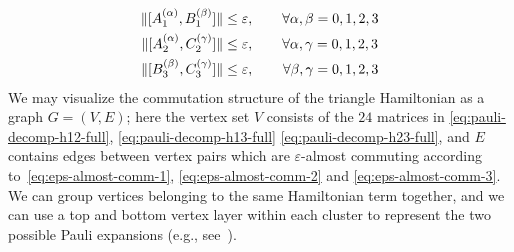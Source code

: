 \documentclass[11pt]{article}
\theoremstyle{plain}
\newcommand{\eps}{\varepsilon}
\begin{document}
\begin{align}
\|[A_1^{(\alpha)}, B_1^{(\beta)}]\| &\leq \eps, \quad\quad \forall 
\alpha,\beta=0,1,2,3 \label{eq:eps-almost-comm-1}\\
\|[A_2^{(\alpha)}, C_2^{(\gamma)}]\| &\leq \eps, \quad\quad \forall 
\alpha,\gamma=0,1,2,3 \label{eq:eps-almost-comm-2}\\
\|[B_3^{(\beta)}, C_3^{(\gamma)}]\| &\leq \eps, \quad\hspace{3.7mm} \forall 
\beta,\gamma=0,1,2,3\label{eq:eps-almost-comm-3}
\end{align}
We may visualize the commutation structure of the triangle Hamiltonian as a graph $G=(V,E)$; here the vertex set $V$ consists of the $24$ matrices in \eqref{eq:pauli-decomp-h12-full}, \eqref{eq:pauli-decomp-h13-full} \eqref{eq:pauli-decomp-h23-full}, and $E$ contains edges between vertex pairs which are $\eps$-almost commuting according to~\eqref{eq:eps-almost-comm-1}, \eqref{eq:eps-almost-comm-2} and \eqref{eq:eps-almost-comm-3}. We can group vertices belonging to the same Hamiltonian term together, and we can use a top and bottom vertex layer within each cluster to represent the two possible Pauli expansions (e.g., see~).
\end{document}
